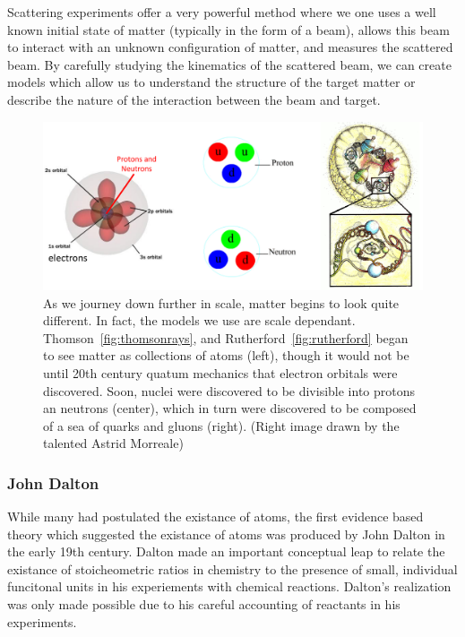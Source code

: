 Scattering experiments offer a very powerful method where we one uses a well
known initial state of matter (typically in the form of a beam), allows this
beam to interact with an unknown configuration of matter, and measures the
scattered beam. By carefully studying the kinematics of the scattered beam, we
can create models which allow us to understand the structure of the target
matter or describe the nature of the interaction between the beam and target. 

\begin{figure}[ht]
	\centering
	\includegraphics[width=\linewidth]{../Chapter2/fig/scale_of_matter.png}
	\caption{
		As we journey down further in scale, matter begins to look quite different.
		In fact, the models we use are scale dependant.
		Thomson~\ref{fig:thomsonrays}, and Rutherford~\ref{fig:rutherford} began to
		see matter as collections of atoms (left), though it would not be until 20th
		century quatum mechanics that electron orbitals were discovered. Soon,
		nuclei were discovered to be divisible into protons an neutrons (center),
		which in turn were discovered to be composed of a sea of quarks and gluons
		(right). (Right image drawn by the talented Astrid Morreale)
	}
	\label{fig:scale_of_matter}
\end{figure}

\subsubsection{John Dalton}

While many had postulated the existance of atoms, the first evidence based
theory which suggested the existance of atoms was produced by John Dalton in the
early 19th century. Dalton made an important conceptual leap to relate the
existance of stoicheometric ratios in chemistry to the presence of small,
individual funcitonal units in his experiements with chemical reactions.
Dalton's realization was only made possible due to his careful accounting of
reactants in his experiments.


